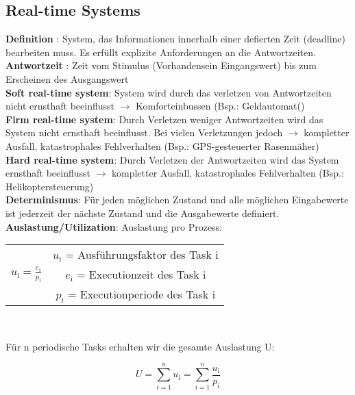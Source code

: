 \subsection{Real-time Systems}
\textbf{Definition} : System, das Informationen innerhalb einer defierten Zeit
(deadline) bearbeiten muss. Es erfüllt explizite Anforderungen an die
Antwortzeiten.\\
\textbf{Antwortzeit} : Zeit vom Stimulus (Vorhandensein
Eingangswert) bis zum Erscheinen des Ausgangswert\\
\textbf{Soft real-time system}: System wird durch das verletzen von
Antwortzeiten nicht ernsthaft beeinflusst $\rightarrow$ Komforteinbussen (Bsp.:
Geldautomat()\\
\textbf{Firm real-time system}: Durch Verletzen weniger Antwortzeiten wird das
System nicht ernsthaft beeinflusst. Bei vielen Verletzungen jedoch $\rightarrow$
kompletter Ausfall, katastrophales Fehlverhalten (Bsp.: GPS-gesteuerter
Rasenmäher)\\
\textbf{Hard real-time system}: Durch Verletzen der Antwortzeiten wird das
System ernsthaft beeinflusst $\rightarrow$ kompletter Ausfall, katastrophales
Fehlverhalten (Bsp.: Helikoptersteuerung)\\
\textbf{Determinismus}: Für jeden möglichen Zustand und alle möglichen
Eingabewerte ist jederzeit der nächste Zustand und die Ausgabewerte definiert.\\
\textbf{Auslastung/Utilization}: 
Auslastung pro Prozess:
\begin{center}  
\begin{tabular}{c c}
& $u_\text{i}$ = Ausführungsfaktor des Task i\\
$u_\text{i} = \frac{e_\text{i}}{p_\text{i}}$&$e_\text{i}$ = Executionzeit des
Task i\\
& $p_\text{i}$ = Executionperiode des Task i
\end{tabular}\\
\end{center}
Für n periodische Tasks erhalten wir die gesamte Auslastung U: 
\begin{center}
\begin{equation}
U = \sum_{i=1}^{n}u_\text{i} = \sum_{i=1}^{n}\frac{u_\text{i}}{p_\text{i}}
\end{equation}
\end{center}

